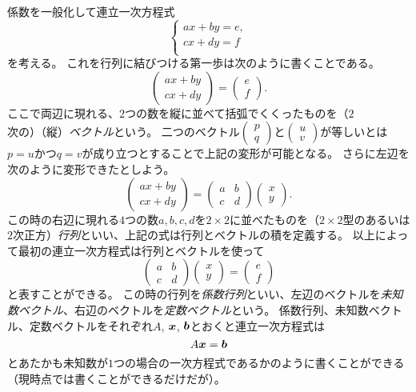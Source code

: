 係数を一般化して連立一次方程式
$$
\begin{cases}
a x+b y = e, \\
c x+d y = f \\
\end{cases}
$$
を考える。
これを行列に結びつける第一歩は次のように書くことである。
$$
\begin{pmatrix}a x+b y \\ c x+d y\end{pmatrix} = \begin{pmatrix}e \\ f\end{pmatrix}.
$$
ここで両辺に現れる、$2$つの数を縦に並べて括弧でくくったものを（$2$次の）（縦）\emph{ベクトル}という。
二つのベクトル$\begin{pmatrix}p \\ q\end{pmatrix}$と$\begin{pmatrix}u \\ v\end{pmatrix}$が等しいとは$p = u$かつ$q = v$が成り立つとすることで上記の変形が可能となる。
さらに左辺を次のように変形できたとしよう。
$$
\begin{pmatrix}a x+b y \\ c x+d y\end{pmatrix} = \begin{pmatrix}a & b \\ c & d\end{pmatrix}\begin{pmatrix}x \\ y\end{pmatrix}.
$$
この時の右辺に現れる$4$つの数$a, b, c, d$を$2\times 2$に並べたものを（$2\times 2$型のあるいは$2$次正方）\emph{行列}といい、上記の式は行列とベクトルの積を定義する。
以上によって最初の連立一次方程式は行列とベクトルを使って
$$
\begin{pmatrix}a & b \\ c & d\end{pmatrix}\begin{pmatrix}x \\ y\end{pmatrix} = \begin{pmatrix}e \\ f\end{pmatrix}
$$
と表すことができる。
この時の行列を\emph{係数行列}といい、左辺のベクトルを\emph{未知数ベクトル}、右辺のベクトルを\emph{定数ベクトル}という。
係数行列、未知数ベクトル、定数ベクトルをそれぞれ$A$, $\vb*{x}$, $\vb*{b}$とおくと連立一次方程式は
$$
A \vb*{x} = \vb*{b}
$$
とあたかも未知数が$1$つの場合の一次方程式であるかのように書くことができる（現時点では書くことができるだけだが）。

